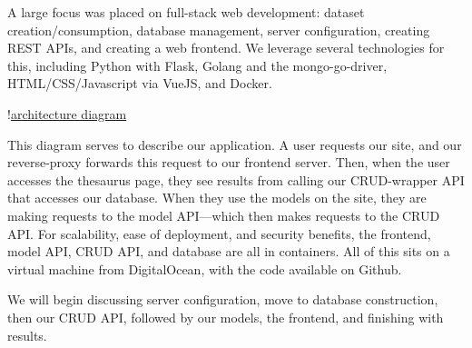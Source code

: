 \documentclass[11pt, twoside, reqno]{book}
\begin{document}
A large focus was placed on full-stack web development: dataset creation/consumption, database management, server configuration, creating REST APIs, and creating a web frontend. We leverage several technologies for this, including Python with Flask\cite{Welcomet33:online}, Golang and the mongo-go-driver\cite{mongogod83:online}, HTML/CSS/Javascript via VueJS\cite{Vuejs17:online}, and Docker\cite{Empoweri41:online}.

!\href{architecture.svg}{architecture diagram}

This diagram serves to describe our application. A user requests our site, and our reverse-proxy forwards this request to our frontend server. Then, when the user accesses the thesaurus page, they see results from calling our CRUD-wrapper API that accesses our database. When they use the models on the site, they are making requests to the model API—which then makes requests to the CRUD API. For scalability, ease of deployment, and security benefits, the frontend, model API, CRUD API, and database are all in containers. All of this sits on a virtual machine from DigitalOcean\cite{DigitalO1:online}, with the code available on Github\cite{GitHub86:online}.

We will begin discussing server configuration, move to database construction, then our CRUD API, followed by our models, the frontend, and finishing with results.
\end{document}
